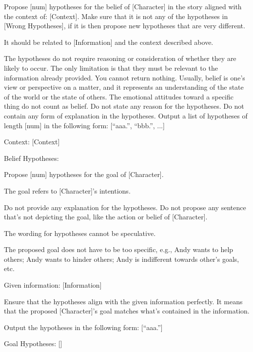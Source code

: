 \begin{tcolorbox}[
    breakable,
    colframe=blue!40!black,
    colback=blue!10,
    coltitle=white,
    fonttitle=\bfseries,
    title=Sampling beliefs,
    colbacktitle=blue!40!black
]
Propose [num] hypotheses for the belief of [Character] in the story aligned with the context of: [Context]. Make sure that it is not any of the hypotheses in [Wrong Hypotheses], if it is then propose new hypotheses that are very different. 

It should be related to [Information] and the context described above.

The hypotheses do not require reasoning or consideration of whether they are likely to occur. The only limitation is that they must be relevant to the information already provided. You cannot return nothing.
Usually, belief is one's view or perspective on a matter, and it represents an understanding of the state of the world or the state of others. The emotional attitudes toward a specific thing do not count as belief.
Do not state any reason for the hypotheses. Do not contain any form of explanation in the hypotheses.
Output a list of hypotheses of length [num] in the following form: [``aaa.'', ``bbb.'', ...] \newline

Context: [Context]

Belief Hypotheses:
\end{tcolorbox}



\begin{tcolorbox}[
    breakable,
    colframe=blue!40!black,
    colback=blue!10,
    coltitle=white,
    fonttitle=\bfseries,
    title=Sampling goals,
    colbacktitle=blue!40!black
]
Propose [num] hypotheses for the goal of [Character].

The goal refers to [Character]'s intentions.

Do not provide any explanation for the hypotheses. Do not propose any sentence that's not depicting the goal, like the action or belief of [Character].

The wording for hypotheses cannot be speculative.

The proposed goal does not have to be too specific, e.g., Andy wants to help others; Andy wants to hinder others; Andy is indifferent towards other's goals, etc.

Given information: [Information]

Ensure that the hypotheses align with the given information perfectly. It means that the proposed [Character]'s goal matches what's contained in the information.

Output the hypotheses in the following form: [``aaa.''] \newline

Goal Hypotheses: []
\end{tcolorbox}



